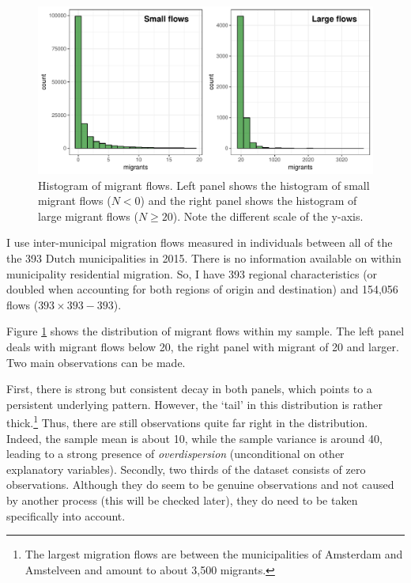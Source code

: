 \documentclass[fleqn,10pt]{SelfArx} %
\begin{document}
        \begin{figure}[h!]\centering %
          \includegraphics[width=0.8\linewidth]{../fig/hist_mig.pdf}
          \caption{Histogram of migrant flows. Left panel shows the
            histogram of small migrant flows ($N<0$) and the right
            panel shows the histogram of large migrant flows
            ($N \geq 20$). Note the different scale of the y-axis.}
          \label{fig:hist_mig}
        \end{figure}


        I use inter-municipal migration flows measured in individuals
        between all of the the 393 Dutch municipalities in 2015. There
        is no information available on within municipality residential
        migration. So, I have 393 regional characteristics (or doubled
        when accounting for both regions of origin and destination)
        and 154,056 flows ($393 \times 393 - 393$).

        Figure \ref{fig:hist_mig} shows the distribution of migrant
        flows within my sample. The left panel deals with migrant
        flows below 20, the right panel with migrant of 20 and
        larger. Two main observations can be made.

        First, there is strong but consistent decay in both panels,
        which points to a persistent underlying pattern. However, the
        `tail' in this distribution is rather thick.\footnote{The
          largest migration flows are between the municipalities of
          Amsterdam and Amstelveen and amount to about 3,500
          migrants.} Thus, there are still observations quite far
        right in the distribution. Indeed, the sample mean is about
        10, while the sample variance is around 40, leading to a
        strong presence of \emph{overdispersion} (unconditional on
        other explanatory variables).  Secondly, two thirds of the
        dataset consists of zero observations. Although they do seem
        to be genuine observations and not caused by another process
        (this will be checked later), they do need to be taken
        specifically into account.
\end{document}
